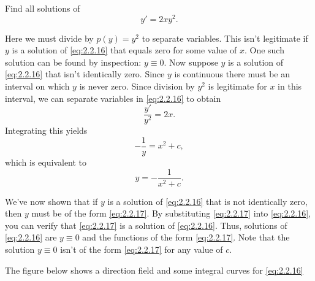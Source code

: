 \documentclass{ximera}
\begin{document}
\begin{example}\label{example:2.2.4}
Find all solutions of
\begin{equation} \label{eq:2.2.16}
y'=2xy^2.
\end{equation}
 
\begin{explanation}
Here we must divide by $p(y)=y^2$ to separate variables.
This isn't  legitimate if $y$ is a solution of \eqref{eq:2.2.16} that
equals zero for some value of $x$. One such solution can be found by
inspection:  $y \equiv 0$. Now suppose   $y$ is a solution
of \eqref{eq:2.2.16} that isn't  identically zero. Since $y$ is continuous there must be an interval on which $y$ is never zero. Since division
by $y^2$ is legitimate for $x$ in this interval, we can separate
variables in \eqref{eq:2.2.16} to obtain
$$
\frac{y'}{y^2}=2x.
$$
 Integrating this yields
$$
-\frac{1}{y}=x^2+c,
$$
which is equivalent to
\begin{equation} \label{eq:2.2.17}
y=-\frac{1}{x^2+c}.
\end{equation}
 
We've now shown that if $y$ is a solution of \eqref{eq:2.2.16} that is
not identically zero, then $y$ must be of the form \eqref{eq:2.2.17}. By
substituting \eqref{eq:2.2.17} into \eqref{eq:2.2.16}, you can verify that
\eqref{eq:2.2.17} is  a solution of \eqref{eq:2.2.16}. Thus,
 solutions of \eqref{eq:2.2.16} are $y\equiv 0$ and the functions
of the form \eqref{eq:2.2.17}. Note that the solution $y\equiv 0$ isn't  of
the form \eqref{eq:2.2.17} for any value of $c$.
 
The figure below shows a direction field and some integral
curves for \eqref{eq:2.2.16}

 \begin{center}
\end{center}
 
\end{explanation}
\end{example}
 
\end{document}
